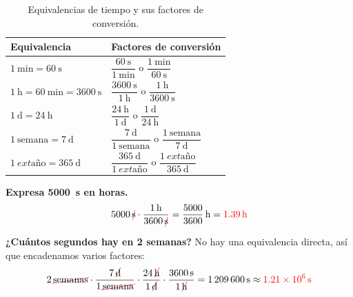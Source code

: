 \begin{table}[H]
    \centering
    \renewcommand{\arraystretch}{2.4}
    \begin{tabular}{ll}
        \toprule
        \textbf{Equivalencia} & \textbf{Factores de conversión} \\
        \midrule
        \(\qty{1}{\minute} = \qty{60}{\s}\) & \(\dfrac{\qty{60}{\s}}{\qty{1}{\minute}}\) o \(\dfrac{\qty{1}{\minute}}{\qty{60}{\s}}\) \\
        \(\qty{1}{\hour} = \qty{60}{\minute} = \qty{3600}{\s}\) & \(\dfrac{\qty{3600}{\s}}{\qty{1}{\hour}}\) o \(\dfrac{\qty{1}{\hour}}{\qty{3600}{\s}}\) \\
        \(\qty{1}{\day} = \qty{24}{\hour}\) & \(\dfrac{\qty{24}{\hour}}{\qty{1}{\day}}\) o \(\dfrac{\qty{1}{\day}}{\qty{24}{\hour}}\) \\
        \(\qty{1}{\text{semana}} = \qty{7}{\day}\) & \(\dfrac{\qty{7}{\day}}{\qty{1}{\text{semana}}}\) o \(\dfrac{\qty{1}{\text{semana}}}{\qty{7}{\day}}\) \\
        \(\qty{1}{	ext{\text{año}}} = \qty{365}{\day}\) & \(\dfrac{\qty{365}{\day}}{\qty{1}{	ext{\text{año}}}}\) o \(\dfrac{\qty{1}{	ext{\text{año}}}}{\qty{365}{\day}}\) \\
        \bottomrule
    \end{tabular}
    \caption{Equivalencias de tiempo y sus factores de conversión.}
    \label{tab:u1_time}
\end{table}

\begin{example}
    \textbf{Expresa \qty{5000}{\s} en horas.}
    \begin{equation*}
        \num{5000}\,\cancelunit{\s} \cdot \dfrac{\qty{1}{\hour}}{\num{3600}\,\cancelunit{\s}} = \dfrac{5000}{3600}\,\unit{\hour} = \textcolor{red}{\qty{1.39}{\hour}}
    \end{equation*}
\end{example}

\begin{example}
    \textbf{¿Cuántos segundos hay en 2 semanas?} No hay una equivalencia directa, así que encadenamos varios factores:
    \begin{equation*}
        \num{2}\,\cancelunit{\text{semanas}} \cdot \dfrac{\num{7}\,\cancelunit{\day}}{1\,\cancelunit{\text{semana}}} \cdot \dfrac{\num{24}\,\cancelunit{\hour}}{1\,\cancelunit{\day}} \cdot \dfrac{\qty{3600}{\s}}{1\,\cancelunit{\hour}} = \qty{1209600}{\s} \approx \textcolor{red}{\qty{1.21e6}{\s}}
    \end{equation*}
\end{example}

